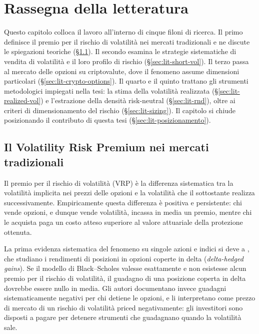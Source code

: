 \chapter{Rassegna della letteratura}
\label{ch:letteratura}

Questo capitolo colloca il lavoro all'interno di cinque filoni di ricerca.
Il primo definisce il premio per il rischio di volatilità nei mercati
tradizionali e ne discute le spiegazioni teoriche
(\S\ref{sec:lit-vrp-tradizionale}). Il secondo esamina le strategie
sistematiche di vendita di volatilità e il loro profilo di rischio
(\S\ref{sec:lit-short-vol}). Il terzo passa al mercato delle opzioni su
criptovalute, dove il fenomeno assume dimensioni particolari
(\S\ref{sec:lit-crypto-options}). Il quarto e il quinto trattano gli
strumenti metodologici impiegati nella tesi: la stima della volatilità
realizzata (\S\ref{sec:lit-realized-vol}) e l'estrazione della densità
risk-neutral (\S\ref{sec:lit-rnd}), oltre ai criteri di dimensionamento del
rischio (\S\ref{sec:lit-sizing}). Il capitolo si chiude posizionando il
contributo di questa tesi (\S\ref{sec:lit-posizionamento}).

\section{Il Volatility Risk Premium nei mercati tradizionali}
\label{sec:lit-vrp-tradizionale}

Il premio per il rischio di volatilità (VRP) è la differenza sistematica
tra la volatilità implicita nei prezzi delle opzioni e la volatilità che il
sottostante realizza successivamente. Empiricamente questa differenza è
positiva e persistente: chi vende opzioni, e dunque vende volatilità,
incassa in media un premio, mentre chi le acquista paga un costo atteso
superiore al valore attuariale della protezione ottenuta.

La prima evidenza sistematica del fenomeno su singole azioni e indici si
deve a \citet{bakshi2003delta}, che studiano i rendimenti di posizioni in
opzioni coperte in delta (\emph{delta-hedged gains}). Se il modello di
Black--Scholes valesse esattamente e non esistesse alcun premio per il
rischio di volatilità, il guadagno di una posizione coperta in delta
dovrebbe essere nullo in media. Gli autori documentano invece guadagni
sistematicamente negativi per chi detiene le opzioni, e li interpretano
come prezzo di mercato di un rischio di volatilità priced negativamente:
gli investitori sono disposti a pagare per detenere strumenti che
guadagnano quando la volatilità sale.

